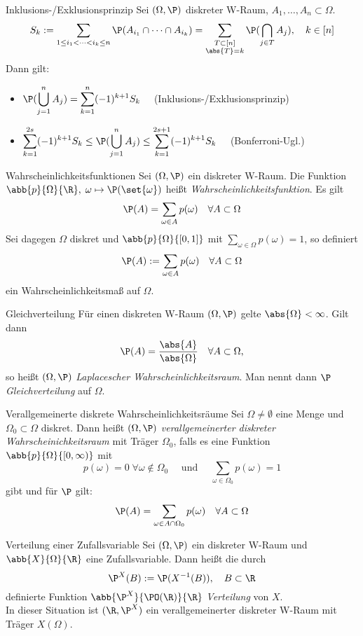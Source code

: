 \begin{karte}{Inklusions-/Exklusionsprinzip}
	Sei $(\Omega,\P)$ diskreter W-Raum, $A_1,\dotsc,A_n \subset \Omega$.
	$$ S_k := \sum_{1 \leq i_1 < \dots < i_k \leq n} \P(A_{i_1} \cap \dots \cap A_{i_k}) = \sum_{\substack{T \subset [n] \\ \abs{T} = k}} \P(\bigcap_{j\in T} A_j), \quad k \in [n] $$
	Dann gilt:
	\begin{itemize}
		\item $\displaystyle \P(\bigcup_{j=1}^{n} A_j) = \sum_{k=1}^{n} (-1)^{k+1}S_k \quad$ (Inklusions-/Exklusionsprinzip)
		\item $\displaystyle \sum_{k=1}^{2s} (-1)^{k+1}S_k \leq \P(\bigcup_{j=1}^{n} A_j) \leq \sum_{k=1}^{2s+1} (-1)^{k+1}S_k \quad$ (Bonferroni-Ugl.)
	\end{itemize}
\end{karte}

\begin{karte}{Wahrscheinlichkeitsfunktionen}
	Sei $(\Omega, \P)$ ein diskreter W-Raum. Die Funktion $\abb{p}{\Omega}{\R},\; \omega \mapsto \P(\set{\omega})$ heißt \textit{Wahrscheinlichkeitsfunktion}. Es gilt
	$$ \P(A) = \sum_{\omega \in A} p(\omega) \quad \forall A \subset \Omega$$
	Sei dagegen $\Omega$ diskret und $\abb{p}{\Omega}{[0,1]}$ mit $\displaystyle \sum_{\omega \in \Omega} p(\omega) = 1$, so definiert
	$$ \P(A) := \sum_{\omega \in A} p(\omega) \quad \forall A \subset \Omega$$ ein Wahrscheinlichkeitsmaß auf $\Omega$.
\end{karte}

\begin{karte}{Gleichverteilung}
	Für einen diskreten W-Raum $(\Omega,\P)$ gelte $\abs{\Omega} < \infty$. Gilt dann $$\P(A) = \frac{\abs{A}}{\abs{\Omega}} \quad \forall A \subset \Omega \text{,}$$ so heißt $(\Omega,\P)$ \textit{Laplacescher Wahrscheinlichkeitsraum}. Man nennt dann $\P$ \textit{Gleichverteilung} auf $\Omega$.
\end{karte}

\begin{karte}{Verallgemeinerte diskrete Wahrscheinlichkeitsräume}
	Sei $\Omega \neq \emptyset$ eine Menge und $\Omega_0 \subset \Omega$ diskret. Dann heißt $(\Omega,\P)$ \textit{verallgemeinerter diskreter Wahrscheinichkeitsraum} mit Träger $\Omega_0$, falls es eine Funktion $\abb{p}{\Omega}{[0,\infty)}$ mit 
	$$p(\omega)=0 \; \forall \omega \notin \Omega_0 \quad \text{ und } \quad \sum_{\omega \in \Omega_0} p(\omega) =1$$
	gibt und für $\P$ gilt:
	$$\P(A)=\sum_{\omega \in A \cap \Omega_0} p(\omega) \quad \forall A \subset \Omega$$
\end{karte}

\begin{karte}{Verteilung einer Zufallsvariable}
	Sei $(\Omega,\P)$ ein diskreter W-Raum und $\abb{X}{\Omega}{\R}$ eine Zufallsvariable. Dann heißt die durch
	$$\P^X(B):=\P(X^{-1}(B)), \quad B \subset \R$$ definierte Funktion $\abb{\P^X}{\PO(\R)}{\R}$ \textit{Verteilung} von $X$. \\
	In dieser Situation ist $(\R,\P^X)$ ein verallgemeinerter diskreter W-Raum mit Träger $X(\Omega)$.
\end{karte}
